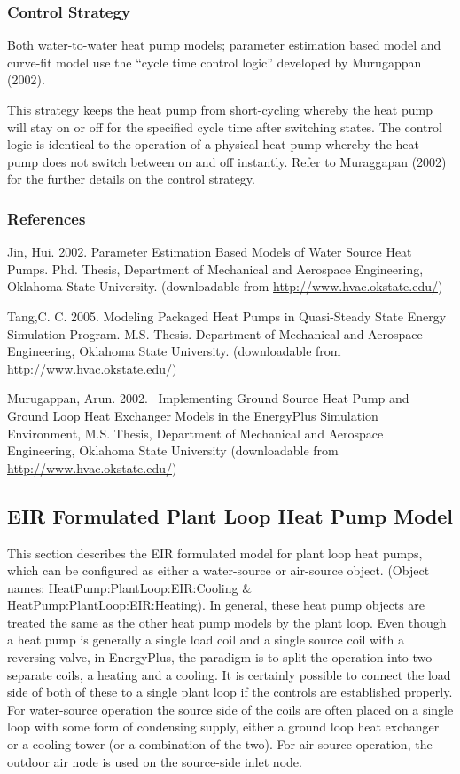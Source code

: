 \subsubsection{Control Strategy}\label{control-strategy}

Both water-to-water heat pump models; parameter estimation based model and curve-fit model use the ``cycle time control logic'' developed by Murugappan (2002).

This strategy keeps the heat pump from short-cycling whereby the heat pump will stay on or off for the specified cycle time after switching states. The control logic is identical to the operation of a physical heat pump whereby the heat pump does not switch between on and off instantly. Refer to Muraggapan (2002) for the further details on the control strategy.

\subsubsection{References}\label{references-1}

Jin, Hui. 2002. Parameter Estimation Based Models of Water Source Heat Pumps. Phd. Thesis, Department of Mechanical and Aerospace Engineering, Oklahoma State University. (downloadable from \href{http://www.hvac.okstate.edu}{http://www.hvac.okstate.edu/})

Tang,C. C. 2005. Modeling Packaged Heat Pumps in Quasi-Steady State Energy Simulation Program. M.S. Thesis. Department of Mechanical and Aerospace Engineering, Oklahoma State University. (downloadable from \href{http://www.hvac.okstate.edu}{http://www.hvac.okstate.edu/})

Murugappan, Arun. 2002.~ Implementing Ground Source Heat Pump and Ground Loop Heat Exchanger Models in the EnergyPlus Simulation Environment, M.S. Thesis, Department of Mechanical and Aerospace Engineering, Oklahoma State University (downloadable from \href{http://www.hvac.okstate.edu}{http://www.hvac.okstate.edu/})

\subsection{EIR Formulated Plant Loop Heat Pump Model}\label{eir-plant-loop-heat-pump-model}

This section describes the EIR formulated model for plant loop heat pumps, which can be configured as either a water-source or air-source object. (Object names: HeatPump:PlantLoop:EIR:Cooling \& HeatPump:PlantLoop:EIR:Heating). In general, these heat pump objects are treated the same as the other heat pump models by the plant loop.  Even though a heat pump is generally a single load coil and a single source coil with a reversing valve, in EnergyPlus, the paradigm is to split the operation into two separate coils, a heating and a cooling.  It is certainly possible to connect the load side of both of these to a single plant loop if the controls are established properly.  For water-source operation the source side of the coils are often placed on a single loop with some form of condensing supply, either a ground loop heat exchanger or a cooling tower (or a combination of the two). For air-source operation, the outdoor air node is used on the source-side inlet node.


